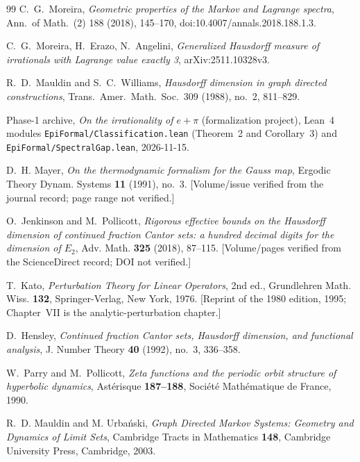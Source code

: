 \documentclass[11pt]{article}
\theoremstyle{definition}
\theoremstyle{remark}
\begin{document}
\begin{thebibliography}{99}
 C.~G.~Moreira, \emph{Geometric properties of the Markov and
Lagrange spectra}, Ann.\ of Math.\ (2) 188 (2018), 145--170,
doi:10.4007/\allowbreak annals.2018.188.1.3.

 C.~G.~Moreira, H.~Erazo, N.~Angelini,
\emph{Generalized Hausdorff measure of irrationals with Lagrange value exactly 3},
arXiv:2511.10328v3.

{\sloppy
{} R.~D.~Mauldin and S.~C.~Williams,
\emph{Hausdorff dimension in graph directed constructions},
Trans.~Amer.~Math.~Soc.~309 (1988), no.~2, 811--829.
}

 Phase-1 archive, \emph{On the irrationality of $e+\pi$}
(formalization project), Lean~4 modules \texttt{EpiFormal/\allowbreak Classification.lean}
(Theorem~2 and Corollary~3) and \texttt{EpiFormal/\allowbreak Spectral\allowbreak Gap.lean}, 2026-11-15.


 D.~H. Mayer, \emph{On the thermodynamic formalism for the
Gauss map}, Ergodic Theory Dynam. Systems \textbf{11} (1991), no.~3.
[Volume/issue verified from the journal record; page range not verified.]

 O.~Jenkinson and M.~Pollicott, \emph{Rigorous
effective bounds on the Hausdorff dimension of continued fraction Cantor sets:
a hundred decimal digits for the dimension of $E_2$}, Adv. Math.
\textbf{325} (2018), 87--115. [Volume/pages verified from the ScienceDirect
record; DOI not verified.]

 T.~Kato, \emph{Perturbation Theory for Linear Operators},
2nd ed., Grundlehren Math. Wiss. \textbf{132}, Springer-Verlag, New York, 1976.
[Reprint of the 1980 edition, 1995; Chapter~VII is the analytic-perturbation
chapter.]

 D.~Hensley, \emph{Continued fraction Cantor sets,
Hausdorff dimension, and functional analysis}, J. Number Theory \textbf{40}
(1992), no.~3, 336--358.

 W.~Parry and M.~Pollicott, \emph{Zeta functions and
the periodic orbit structure of hyperbolic dynamics}, Ast\'erisque
\textbf{187--188}, Soci\'et\'e Math\'ematique de France, 1990.

 R.~D. Mauldin and M. Urba\'nski, \emph{Graph
Directed Markov Systems: Geometry and Dynamics of Limit Sets}, Cambridge Tracts
in Mathematics \textbf{148}, Cambridge University Press, Cambridge, 2003.
\end{thebibliography}
\end{document}
